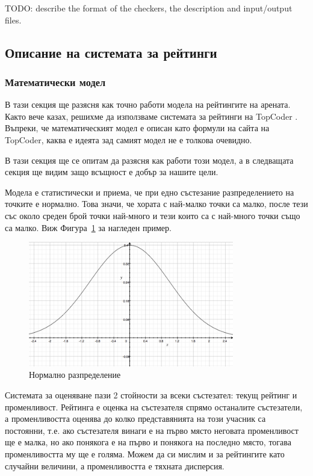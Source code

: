 \documentclass[a4paper,12pt]{article}
\begin{document}
    TODO: describe the format of the checkers, the description and input/output files.
  \subsection{Описание на системата за рейтинги}
  
  
  \subsubsection{Математически модел}
  В тази секция ще разясня как точно работи модела на рейтингите на арената. Както вече казах, решихме да използваме системата за рейтинги на TopCoder \cite{topcoder_ratings}. Въпреки, че математическият модел е описан като формули на сайта на TopCoder, каква е идеята зад самият модел не е толкова очевидно.

  В тази секция ще се опитам да разясня как работи този модел, а в следващата секция ще видим защо всъщност е добър за нашите цели.
  
  Модела е статистически и приема, че при едно състезание разпределението на точките е нормално. Това значи, че хората с най-малко точки са малко, после тези със около среден брой точки най-много и тези които са с най-много точки също са малко. Виж Фигура~\ref{normal_distribution} за нагледен пример.
  
  \begin{figure}
    \begin{center}
      \includegraphics[width=0.8\textwidth]{normal_distribution.png}
    \end{center}
    \caption{Нормално разпределение}
    \label{normal_distribution}
  \end{figure}
  
  Системата за оценяване пази 2 стойности за всеки състезател: текущ рейтинг и променливост. Рейтинга е оценка на състезателя спрямо останалите състезатели, а променливостта оценява до колко представянията на този учасник са постоянни, т.е. ако състезателя винаги е на първо място неговата променливост ще е малка, но ако понякога е на първо и понякога на последно място, тогава променливостта му ще е голяма. Можем да си мислим и за рейтингите като случайни величини, а променливостта е тяхната дисперсия. 
  
\end{document}
